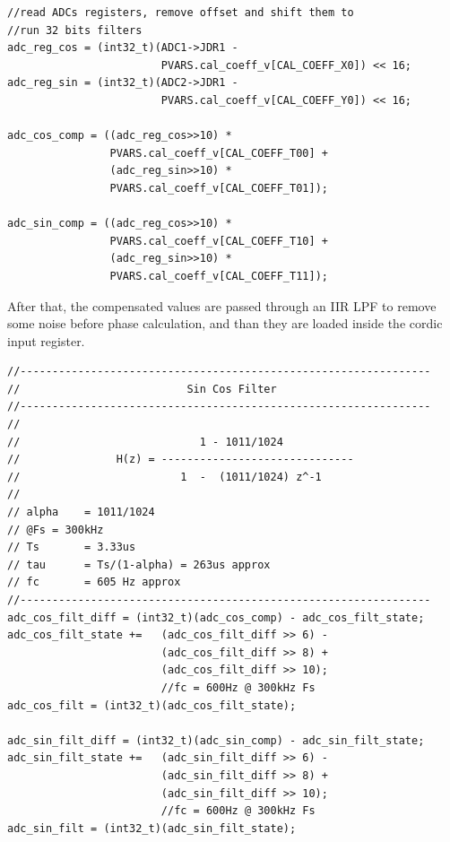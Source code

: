 \documentclass[main]{subfiles}
\begin{document}
\begin{minipage}{\linewidth}
\begin{lstlisting}[caption=compensation code]
//read ADCs registers, remove offset and shift them to 
//run 32 bits filters
adc_reg_cos = (int32_t)(ADC1->JDR1 - 
                        PVARS.cal_coeff_v[CAL_COEFF_X0]) << 16;
adc_reg_sin = (int32_t)(ADC2->JDR1 - 
                        PVARS.cal_coeff_v[CAL_COEFF_Y0]) << 16;

adc_cos_comp = ((adc_reg_cos>>10) * 
                PVARS.cal_coeff_v[CAL_COEFF_T00] + 
                (adc_reg_sin>>10) * 
                PVARS.cal_coeff_v[CAL_COEFF_T01]);

adc_sin_comp = ((adc_reg_cos>>10) * 
                PVARS.cal_coeff_v[CAL_COEFF_T10] + 
                (adc_reg_sin>>10) * 
                PVARS.cal_coeff_v[CAL_COEFF_T11]);
\end{lstlisting}
\end{minipage}

After that, the compensated values are passed through an \ac{IIR} \ac{LPF}
to remove some noise before phase calculation, and than they are loaded inside 
the cordic input register.

\begin{minipage}[h]{\linewidth}
\begin{lstlisting}[caption=sin and cos filtering code]
//----------------------------------------------------------------
//                          Sin Cos Filter
//----------------------------------------------------------------
//
//                            1 - 1011/1024
//               H(z) = ------------------------------
//                         1  -  (1011/1024) z^-1
//
// alpha    = 1011/1024
// @Fs = 300kHz
// Ts       = 3.33us
// tau      = Ts/(1-alpha) = 263us approx
// fc       = 605 Hz approx
//----------------------------------------------------------------
adc_cos_filt_diff = (int32_t)(adc_cos_comp) - adc_cos_filt_state;
adc_cos_filt_state +=   (adc_cos_filt_diff >> 6) - 
                        (adc_cos_filt_diff >> 8) + 
                        (adc_cos_filt_diff >> 10);      
                        //fc = 600Hz @ 300kHz Fs
adc_cos_filt = (int32_t)(adc_cos_filt_state);

adc_sin_filt_diff = (int32_t)(adc_sin_comp) - adc_sin_filt_state;
adc_sin_filt_state +=   (adc_sin_filt_diff >> 6) - 
                        (adc_sin_filt_diff >> 8) + 
                        (adc_sin_filt_diff >> 10);      
                        //fc = 600Hz @ 300kHz Fs
adc_sin_filt = (int32_t)(adc_sin_filt_state);
\end{lstlisting}
\end{minipage}
\end{document}
